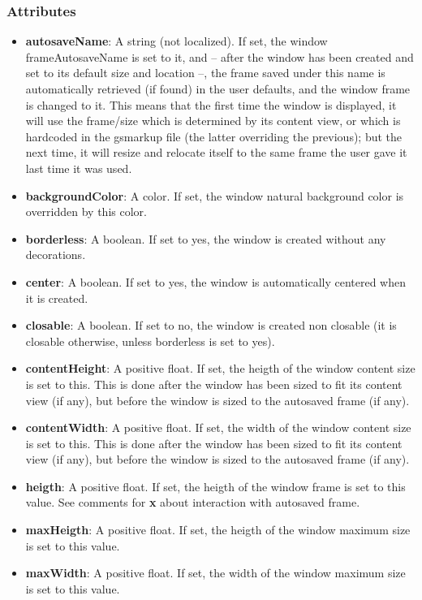 \subsubsection{Attributes}
\begin{itemize}
\item {\bf autosaveName}: A string (not localized).  If set, the window 
frameAutosaveName is set to it, and -- after the window has been
created and set to its default size and location --, the frame saved
under this name is automatically retrieved (if found) in the user
defaults, and the window frame is changed to it.  This means that the
first time the window is displayed, it will use the frame/size which
is determined by its content view, or which is hardcoded in the gsmarkup
file (the latter overriding the previous); but the next time, it will
resize and relocate itself to the same frame the user gave it last
time it was used.
\item {\bf backgroundColor}: A color.  If set, the window natural background
color is overridden by this color.
\item {\bf borderless}: A boolean.  If set to yes, the window is created without
any decorations.
\item {\bf center}: A boolean.  If set to yes, the window is automatically 
centered when it is created.
\item {\bf closable}: A boolean.  If set to no, the window is created non closable
(it is closable otherwise, unless borderless is set to yes).
\item {\bf contentHeight}: A positive float.  If set, the heigth of the window
content size is set to this.  This is done after the window has been
sized to fit its content view (if any), but before the window is sized
to the autosaved frame (if any).
\item {\bf contentWidth}: A positive float.  If set, the width of the window
content size is set to this.  This is done after the window has been sized
to fit its content view (if any), but before the window is sized to the
autosaved frame (if any).
\item {\bf heigth}: A positive float.  If set, the heigth
of the window frame is set to this value.  See comments for {\bf x}
about interaction with autosaved frame.
\item {\bf maxHeigth}: A positive float.  If set, the heigth
of the window maximum size is set to this value.
\item {\bf maxWidth}: A positive float.  If set, the width  
of the window maximum size is set to this value.

\end{itemize}
